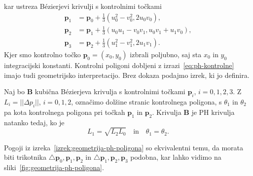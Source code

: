 \documentclass[isrm2, tisk]{fmfdelo}
\newcommand{\p}{\mathbf{p}}
\begin{document}
    kar ustreza Bézierjevi krivulji s kontrolnimi točkami
    \begin{align}
        \p_1 &=\p_0+\frac{1}{3}(u_0^2-v_0^2,2u_0v_0), \nonumber\\
        \p_2 &= \p_1+\frac{1}{3}(u_0u_1-v_0v_1, u_0v_1+u_1v_0),\label{eq:ph-kontrolne}\\
        \p_3 &= \p_2 + \frac{1}{3}(u_1^2-v_1^2, 2u_1v_1). \nonumber
    \end{align}
    Kjer smo kontrolno točko $\p_0=(x_0,y_0)$ izbrali poljubno, saj sta $x_0$ in $y_0$ integracijski konstanti.
    Kontrolni poligoni dobljeni z izrazi~\eqref{eq:ph-kontrolne} imajo tudi geometrijsko interpretacijo.
    Brez dokaza podajmo izrek, ki jo definira.
    \begin{izrek}
        \label{izrek:geometrija-ph-poligona}
        Naj bo $\mathbf{B}$ kubična Bézierjeva krivulja s kontrolnimi točkami $\p_i$, $i=0,1,2,3$.
        Z $L_i=||\Delta p_i||$, $i=0,1,2$, označimo dolžine stranic kontrolnega poligona, s $\theta_1$ in $\theta_2$ pa kota kontrolnega poligona pri točkah $\p_1$ in  $\p_2$.
        Krivulja $\mathbf{B}$ je PH krivulja natanko tedaj, ko je
        \[L_1=\sqrt{L_2L_0}\quad \text{in} \quad \theta_1=\theta_2 .\]
    \end{izrek}
    \noindent Pogoji iz izreka~\ref{izrek:geometrija-ph-poligona} so ekvivalentni temu, da morata biti trikotnika $\triangle \p_0,\p_1,\p_2$ in $\triangle \p_1,\p_2,\p_3$ podobna, kar lahko vidimo na sliki~\ref{fig:geometrija-ph-poligona}.
\end{document}
